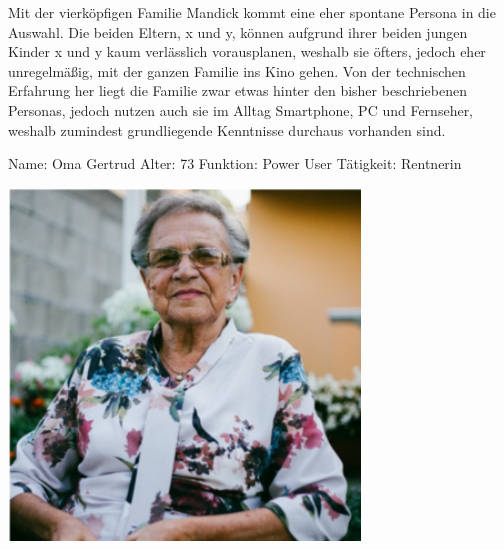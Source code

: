 Mit der vierköpfigen Familie Mandick kommt eine eher spontane Persona in die Auswahl. Die beiden Eltern, x und y, können aufgrund ihrer beiden jungen Kinder x und y kaum verlässlich vorausplanen, weshalb sie öfters, jedoch eher unregelmäßig, mit der ganzen Familie ins Kino gehen. Von der technischen Erfahrung her liegt die Familie zwar etwas hinter den bisher beschriebenen Personas, jedoch nutzen auch sie im Alltag Smartphone, PC und Fernseher, weshalb zumindest grundliegende Kenntnisse durchaus vorhanden sind.

\newpage
{}
\begin{minipage}[t]{0.5\textwidth} 	\vspace{0.0\baselineskip} %
	\begin{entrylist}
		\entry
		{Name:}
		{Oma Gertrud}
		\entry
		{Alter:}
		{73}
		\entry
		{Funktion:}
		{Power User}
		\entry
		{Tätigkeit:}
		{Rentnerin}
	\end{entrylist}
	\begin{barchart}{5.0}\hspace{-1.5mm}
	\end{barchart}
\end{minipage}
\hfil
\begin{minipage}[t]{0.4\textwidth} 	\vspace{0.0\baselineskip} %
		\flushright
		\includegraphics[width=0.70\textwidth]{img/oma_gertrud}
\end{minipage}


